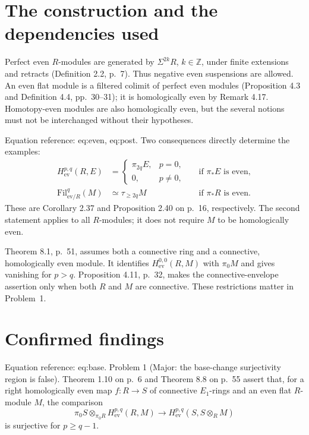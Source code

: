 \documentclass[10pt]{article}
\begin{document}
\section*{The construction and the dependencies used}
Perfect even \(R\)-modules are generated by \(\Sigma^{2k}R\), \(k\in\mathbb Z\), under finite extensions and retracts (Definition 2.2, p. 7). Thus negative even suspensions are allowed. An even flat module is a filtered colimit of perfect even modules (Proposition 4.3 and Definition 4.4, pp. 30–31); it is homologically even by Remark 4.17. Homotopy-even modules are also homologically even, but the several notions must not be interchanged without their hypotheses.\par
Equation reference: eq:even, eq:post. Two consequences directly determine the examples: \[\begin{aligned}
 H_{\mathrm{ev}}^{p,q}(R,E)&=
 \begin{cases}\pi_{2q}E,&p=0,\\0,&p\ne0,\end{cases}
 &&\text{if $\pi_*E$ is even},                         \\
 \mathrm{Fil}_{\mathrm{ev}/R}^{q}(M)&\simeq\tau_{\ge 2q}M
 &&\text{if $\pi_*R$ is even}.                         \end{aligned}\] These are Corollary 2.37 and Proposition 2.40 on p. 16, respectively. The second statement applies to all \(R\)-modules; it does not require \(M\) to be homologically even.\par
Theorem 8.1, p. 51, assumes both a connective ring and a connective, homologically even module. It identifies \(H_{\mathrm{ev}}^{0,0}(R,M)\) with \(\pi_0M\) and gives vanishing for \(p>q\). Proposition 4.11, p. 32, makes the connective-envelope assertion only when both \(R\) and \(M\) are connective. These restrictions matter in Problem 1.\par
\section*{Confirmed findings}
Equation reference: eq:base. Problem 1 (Major: the base-change surjectivity region is false).  Theorem 1.10 on p. 6 and Theorem 8.8 on p. 55 assert that, for a right homologically even map \(f:R\to S\) of connective \(E_1\)-rings and an even flat \(R\)-module \(M\), the comparison \[\pi_0S\otimes_{\pi_0R}H_{\mathrm{ev}}^{p,q}(R,M)
 \longrightarrow H_{\mathrm{ev}}^{p,q}(S,S\otimes_R M)             \] is surjective for \(p\ge q-1\).\par
\end{document}
